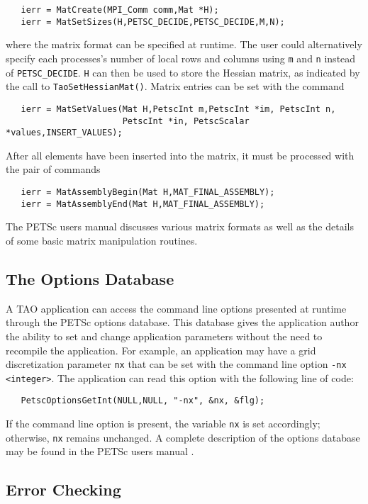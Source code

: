 \begin{verbatim}
   ierr = MatCreate(MPI_Comm comm,Mat *H);
   ierr = MatSetSizes(H,PETSC_DECIDE,PETSC_DECIDE,M,N);
\end{verbatim}
\noindent
where the matrix format can be specified at runtime.  The user could
alternatively specify each processes's number of local rows and columns
using \texttt{m} and \texttt{n} instead of \texttt{PETSC\_DECIDE}.  
\texttt{H} can then be used to store
the Hessian matrix, as indicated by the call to
\texttt{TaoSetHessianMat()}.  Matrix entries can be set with the
command
\begin{verbatim}
   ierr = MatSetValues(Mat H,PetscInt m,PetscInt *im, PetscInt n,
                       PetscInt *in, PetscScalar *values,INSERT_VALUES);
\end{verbatim}
\noindent
After %
all elements have been inserted into the
matrix, it must be processed with the pair of commands

\begin{verbatim}
   ierr = MatAssemblyBegin(Mat H,MAT_FINAL_ASSEMBLY);
   ierr = MatAssemblyEnd(Mat H,MAT_FINAL_ASSEMBLY);
\end{verbatim}
\noindent
The PETSc users manual \cite{petsc-user-ref} discusses
various matrix formats as
well as the details of some basic matrix manipulation routines.


\subsection*{The Options Database}
\label{sec:options}
A TAO application can access the command line options presented at
runtime through the PETSc options database. This database gives the application
author the ability to set and change application parameters without
the need to recompile the application. For example, 
an application may have a grid discretization parameter \texttt{nx}
that can be set with the command line option \texttt{-nx <integer>}.
The application can read this option with the following line of code:
\begin{verbatim}
   PetscOptionsGetInt(NULL,NULL, "-nx", &nx, &flg);
\end{verbatim}
\noindent
If the command line option is present, the variable \texttt{nx} is set
accordingly; otherwise, \texttt{nx} remains unchanged. A complete
description of the options database may be found in the PETSc users
manual \cite{petsc-user-ref}.

\subsection*{Error Checking}

